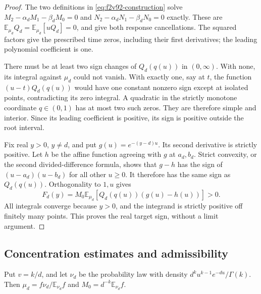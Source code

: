 \documentclass[11pt]{article}
\theoremstyle{definition}
\theoremstyle{remark}
\begin{document}
\begin{proof}
The two definitions in \eqref{eq:f2v92-construction} solve
\(M_2-\alpha_dM_1-\beta_dM_0=0\) and
\(N_2-\alpha_dN_1-\beta_dN_0=0\) exactly.  These are
\(\mathbb E_{\mu_d}Q_d=\mathbb E_{\mu_d}[uQ_d]=0\), and
give both response cancellations.  The squared factors give the
prescribed time zeros, including their first derivatives; the leading
polynomial coefficient is one.

There must be at least two sign changes of \(Q_d(q(u))\) in
\((0,\infty)\).  With none, its integral against \(\mu_d\)
could not vanish.  With exactly one, say at \(t\), the function
\((u-t)Q_d(q(u))\) would have one constant nonzero sign except at
isolated points, contradicting its zero integral.  A quadratic in the
strictly monotone coordinate \(q\in(0,1)\) has at most two such
zeros.  They are therefore simple and interior.  Since its leading
coefficient is positive, its sign is positive outside the root interval.

Fix real \(y>0\), \(y\ne d\), and put \(g(u)=e^{-(y-d)u}\).
Its second derivative is strictly positive.  Let \(h\) be the affine
function agreeing with \(g\) at \(a_d,b_d\).  Strict convexity,
or the second divided-difference formula, shows that \(g-h\) has
the sign of \((u-a_d)(u-b_d)\) for all other \(u\ge0\).
It therefore has the same sign as \(Q_d(q(u))\).  Orthogonality to
\(1,u\) gives
\[
 F_d(y)=M_0\mathbb E_{\mu_d}[Q_d(q(u))(g(u)-h(u))]>0.
\]
All integrals converge because \(y>0\), and the integrand is
strictly positive off finitely many points.  This proves the real
target sign, without a limit argument.
\end{proof}

\subsection{Concentration estimates and admissibility}

Put \(v=k/d\), and let \(\nu_d\) be the probability law with
density \(d^ku^{k-1}e^{-du}/\Gamma(k)\).  Then
\(\mu_d=f\nu_d/\mathbb E_{\nu_d}f\) and
\(M_0=d^{-k}\mathbb E_{\nu_d}f\).
\end{document}
